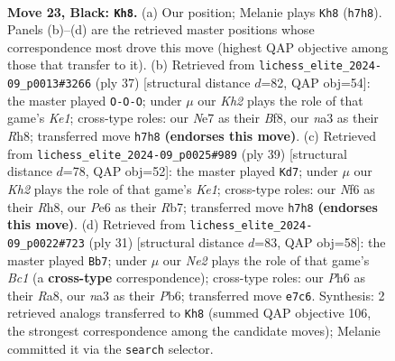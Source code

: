 \documentclass[11pt]{article}
\begin{document}
\clearpage

\begin{figure}[p]\centering
\begin{subfigure}{0.46\textwidth}\centering
\resizebox{\linewidth}{!}{%
\newchessgame
\chessboard[
  setfen={1rb2r2/p3np1k/1p2pnpp/2P5/1RP5/N3PB1P/P2B1PP1/4R1K1 b - - 5 23},
  showmover=false,
  pgfstyle=straightmove, color=movearrow, markmove={h7-h8}
]}
\caption{}
\end{subfigure}\hfill
\begin{subfigure}{0.46\textwidth}\centering
\resizebox{\linewidth}{!}{%
\newchessgame
\chessboard[
  setfen={r3kb1r/1p4p1/p1p1np2/4P2p/2N1P2P/1PP2P2/1P1B1P2/R3K2R b KQkq - 0 19},
  showmover=false,
  pgfstyle=straightmove, color=movearrow, markmove={e8-c8}
]}
\caption{}
\end{subfigure}
\\[4pt]
\begin{subfigure}{0.46\textwidth}\centering
\resizebox{\linewidth}{!}{%
\newchessgame
\chessboard[
  setfen={4k2r/1r3pp1/p1nBpn1p/1p1p4/8/P1P2B2/1P3PPP/3RR1K1 b k - 0 20},
  showmover=false,
  pgfstyle=straightmove, color=movearrow, markmove={e8-d7}
]}
\caption{}
\end{subfigure}\hfill
\begin{subfigure}{0.46\textwidth}\centering
\resizebox{\linewidth}{!}{%
\newchessgame
\chessboard[
  setfen={r1br2k1/p4ppp/1pn1pn2/4N3/2PP4/1P6/1B2BPPP/R2R2K1 b - - 1 16},
  showmover=false,
  pgfstyle=straightmove, color=movearrow, markmove={c8-b7}
]}
\caption{}
\end{subfigure}
\caption{\textbf{Move 23, Black: \texttt{Kh8}.} (a) Our position; Melanie plays \texttt{Kh8} (\texttt{h7h8}). Panels (b)--(d) are the retrieved master positions whose correspondence most drove this move (highest QAP objective among those that transfer to it). (b) Retrieved from \texttt{lichess\_elite\_2024-09\_p0013\#3266} (ply 37) [structural distance $d$=82, QAP obj=54]: the master played \texttt{O-O-O}; under $\mu$ our \emph{Kh2} plays the role of that game's \emph{Ke1}; cross-type roles: our \emph{N}e7 as their \emph{B}f8, our \emph{n}a3 as their \emph{R}h8; transferred move \texttt{h7h8} \textbf{(endorses this move)}. (c) Retrieved from \texttt{lichess\_elite\_2024-09\_p0025\#989} (ply 39) [structural distance $d$=78, QAP obj=52]: the master played \texttt{Kd7}; under $\mu$ our \emph{Kh2} plays the role of that game's \emph{Ke1}; cross-type roles: our \emph{N}f6 as their \emph{R}h8, our \emph{P}e6 as their \emph{R}b7; transferred move \texttt{h7h8} \textbf{(endorses this move)}. (d) Retrieved from \texttt{lichess\_elite\_2024-09\_p0022\#723} (ply 31) [structural distance $d$=83, QAP obj=58]: the master played \texttt{Bb7}; under $\mu$ our \emph{Ne2} plays the role of that game's \emph{Bc1} (a \textbf{cross-type} correspondence); cross-type roles: our \emph{P}h6 as their \emph{R}a8, our \emph{n}a3 as their \emph{P}b6; transferred move \texttt{e7c6}. Synthesis: 2 retrieved analogs transferred to \texttt{Kh8} (summed QAP objective 106, the strongest correspondence among the candidate moves); Melanie committed it via the \texttt{search} selector.}
\label{fig:thought-m45}
\end{figure}
\end{document}
